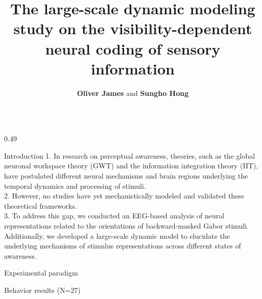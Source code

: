 \documentclass{beamer}
\begin{document}

\title[]{\Huge The large-scale dynamic modeling study on the visibility-dependent neural coding of sensory information \\[-0.1 in]}
\author[]{\LARGE \textbf{Oliver James} and \textbf{Sungho Hong} \\[-0.1 in] }
\date{}



\begin{frame}
\vspace{-0.3 in}
\maketitle

 \begin{columns}
        \begin{column}{0.49\linewidth}
        \vspace{0 in}
            \begin{block}{\LARGE Introduction}
            \justifying
        {\large 1. In research on perceptual awareness, theories, such as the global neuronal workspace theory (GWT) and the information integration theory (IIT), have postulated different neural mechanisms and brain regions underlying the temporal dynamics and processing of  stimuli. \\[0.3 cm]
2. However, no studies have yet mechanistically modeled and validated these theoretical frameworks.\\[0.3 cm]
3. To address this gap, we conducted an EEG-based analysis of neural representations related to the orientations of backward-masked Gabor stimuli. Additionally, we developed a large-scale dynamic model to elucidate the underlying mechanisms of stimulus representations across different states of awareness.
               }
            \end{block}
            \vspace{0.5cm}
            \begin{block}{\LARGE Experimental paradigm}
            \centering
            \vspace{0.5cm}
            \end{block}

            \begin{block}{\LARGE Behavior results (N=27)}
            \centering
            \end{block}


\end{column}
\end{columns}
\end{frame}
\end{document}
